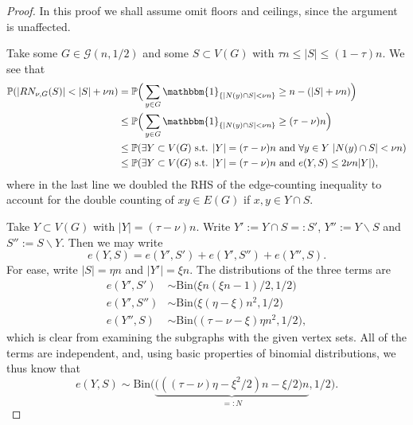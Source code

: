 \documentclass[10pt,letterpaper, reqno]{amsart}
\theoremstyle{definition}
\numberwithin{equation}{section}
\begin{document}
\begin{proof} 
	In this proof we shall assume omit floors and ceilings, since the argument is unaffected. 
	
	Take some $G \in \mathcal{G}(n,1/2)$ and some $S \subset V(G)$ with $\tau n \leq |S| \leq (1-\tau)n$. We see that 
	\begin{align*}
	\mathbb{P}(|RN_{\nu,G}(S)| < |S| + \nu n) &= \mathbb{P}\Big(\sum_{y \in G} \mathbbm{1}_{\{|N(y)\cap S| < \nu n \}} \geq n - (|S| + \nu n) \Big) \\ 
	& \leq \mathbb{P}\Big(\sum_{y \in G} \mathbbm{1}_{\{|N(y)\cap S| < \nu n \} } \geq (\tau - \nu)n \Big) \\
	& \leq \mathbb{P}(\exists Y \subset V(G) \text{ s.t. } |Y|=(\tau-\nu)n \text{ and } \forall y \in Y \ |N(y) \cap S| < \nu n) \\
	& \leq \mathbb{P}(\exists Y \subset V(G) \text{ s.t. } |Y|=(\tau-\nu)n \text{ and }e(Y,S) \leq 2 \nu n|Y|),
	\end{align*}
	where in the last line we doubled the RHS of the edge-counting inequality to account for the double counting of $xy \in E(G)$ if $x,y \in Y \cap S$.
	
	Take $Y \subset V(G)$ with $|Y| = (\tau-\nu)n$. Write $Y' := Y \cap S =: S'$, $Y'':= Y \backslash S$ and $S'' := S\backslash Y$. Then we may write 
	$$e(Y,S) = e(Y',S') + e(Y', S'') + e(Y'',S).$$
	For ease, write $|S| = \eta n$ and  $|Y'| = \xi n$. The distributions of the three terms are 
	\begin{align*}
	e(Y',S') &\sim \text{Bin}\big(\xi n (\xi n-1)/2, 1/2\big) \\
	e(Y',S'') & \sim \text{Bin}\big(\xi(\eta-\xi)n^2, 1/2\big)\\
	e(Y'',S) & \sim \text{Bin}\big((\tau-\nu-\xi)\eta n^2, 1/2\big),
	\end{align*}
	which is clear from examining the subgraphs with the given vertex sets. All of the terms are independent, and, using basic properties of binomial distributions, we thus know that 
	$$e(Y,S) \sim \text{Bin}\Big(\underbrace{\big( ( (\tau - \nu)\eta - \xi^2/2)n - \xi/2\big)n}_{=:N},1/2\Big).$$
	

\end{proof}
\end{document}
